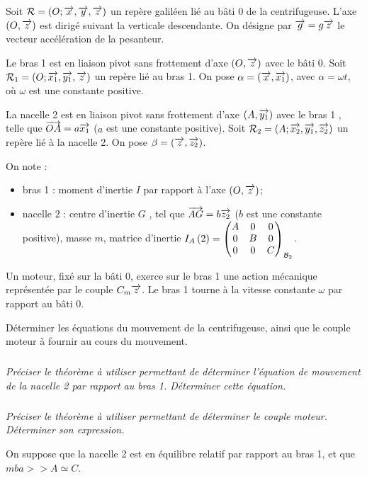 \documentclass[10pt,fleqn]{article} %
\begin{document}
\begin{multicols}{2}
Soit $\mathcal{R}=\repere{O}{x}{y}{z}$ un repère galiléen lié au bâti 0 de la centrifugeuse. L'axe $\axe{O}{z}$ est dirigé suivant la verticale descendante. 
On désigne par $\vect{g}=g\vect{z}$ le vecteur accélération de la pesanteur.

Le bras 1 est en liaison pivot sans frottement d’axe $\axe{O}{z}$ avec le bâti 0. Soit $\mathcal{R}_1=\repere{O}{x_1}{y_1}{z}$ un repère lié au bras 1. On pose $\alpha=\angl{x}{x_1}$, avec $\alpha=\omega t$, où $\omega$ est une constante positive. 

La nacelle 2 est en liaison pivot sans frottement d’axe $\axe{A}{y_1}$ avec le bras 1 , telle que $\vect{OA}=a\vect{x_1}$ ($a$ est une constante positive). Soit $\mathcal{R}_2=\repere{A}{x_2}{y_1}{z_2}$ un repère lié à la nacelle 2. On pose $\beta=\angl{z}{z_2}$. 

On note :
\begin{itemize}
\item bras 1 : moment d’inertie $I$ par rapport à l’axe $\axe{O}{z}$;
\item nacelle 2 : centre d’inertie $G$ , tel que $\vect{AG}=b\vect{z_2}$ ($b$ est une constante positive), masse $m$, 
matrice d’inertie $\inertie{A}{2}=\matinertie{A}{B}{C}{0}{0}{0}{\mathcal{B}_2}$. 
\end{itemize}
Un moteur, fixé sur la bâti 0, exerce sur le bras 1 une action mécanique représentée par le couple $C_m\vect{z}$.
Le bras 1 tourne à la vitesse constante $\omega$ par rapport au bâti 0.

\begin{obj}
Déterminer les équations du mouvement de la centrifugeuse, ainsi que le couple moteur à fournir au cours du
mouvement.
\end{obj}

\subparagraph{}
\textit{Préciser le théorème à utiliser permettant de déterminer l’équation de mouvement de la nacelle 2 par rapport au
bras 1. Déterminer cette équation.}
\ifprof
\begin{corrige}
\end{corrige}
\else
\fi

\subparagraph{}
\textit{Préciser le théorème à utiliser permettant de déterminer le couple moteur. Déterminer son expression.}
\ifprof
\begin{corrige}
\end{corrige}
\else
\fi

On suppose que la nacelle 2 est en équilibre relatif par rapport au bras 1, et que $mba> > A \simeq C$.


\end{multicols}
\end{document}
